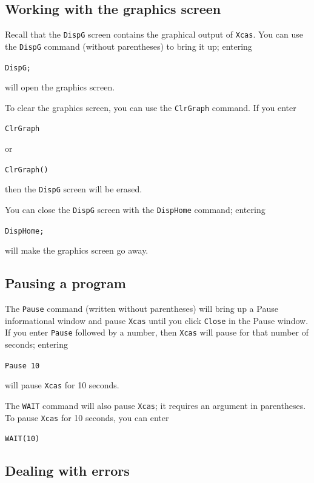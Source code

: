 \documentclass[a4paper,11pt]{book}
\begin{document}
\subsection{Working with the graphics screen}

Recall that the \texttt{DispG} screen contains the
graphical output of \texttt{Xcas}.  You can use the \texttt{DispG}
command (without parentheses) to bring it up; entering
\begin{center}
  {\tt DispG;}
\end{center}
will open the graphics screen.

To clear the graphics screen, you can use the
\texttt{ClrGraph} command.  If you enter
\begin{center}
  {\tt ClrGraph}
\end{center}
or
\begin{center}
  {\tt ClrGraph()}
\end{center}
then the \texttt{DispG} screen will be erased.

You can close the \texttt{DispG} screen with the \texttt{DispHome}
command; entering
\begin{center}
  {\tt DispHome;}
\end{center}
will make the graphics screen go away.

\subsection{Pausing a program}

The \texttt{Pause} command (written without parentheses)
will bring up a Pause informational window and pause \texttt{Xcas}
until you click \texttt{Close} in the Pause window.  If you enter
\texttt{Pause} followed by a number, then \texttt{Xcas} will pause for
that number of seconds; entering
\begin{center}
  {\tt Pause 10}
\end{center}
will pause \texttt{Xcas} for 10 seconds.

The \texttt{WAIT} command will also pause \texttt{Xcas};
it requires an argument in parentheses.  To pause \texttt{Xcas} for 10
seconds, you can enter
\begin{center}
  {\tt WAIT(10)}
\end{center}

\subsection{Dealing with errors}
\end{document}
